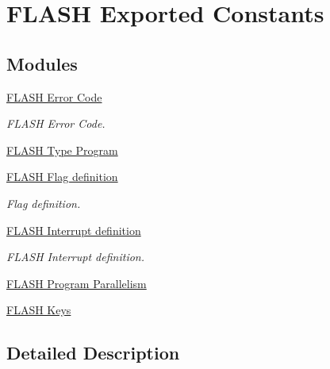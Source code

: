 \hypertarget{group___f_l_a_s_h___exported___constants}{}\section{F\+L\+A\+SH Exported Constants}
\label{group___f_l_a_s_h___exported___constants}
\subsection*{Modules}
\begin{DoxyCompactItemize}
\item 
\hyperlink{group___f_l_a_s_h___error___code}{F\+L\+A\+S\+H Error Code}
\begin{DoxyCompactList}\small\item\em F\+L\+A\+SH Error Code. \end{DoxyCompactList}\item 
\hyperlink{group___f_l_a_s_h___type___program}{F\+L\+A\+S\+H Type Program}
\item 
\hyperlink{group___f_l_a_s_h___flag__definition}{F\+L\+A\+S\+H Flag definition}
\begin{DoxyCompactList}\small\item\em Flag definition. \end{DoxyCompactList}\item 
\hyperlink{group___f_l_a_s_h___interrupt__definition}{F\+L\+A\+S\+H Interrupt definition}
\begin{DoxyCompactList}\small\item\em F\+L\+A\+SH Interrupt definition. \end{DoxyCompactList}\item 
\hyperlink{group___f_l_a_s_h___program___parallelism}{F\+L\+A\+S\+H Program Parallelism}
\item 
\hyperlink{group___f_l_a_s_h___keys}{F\+L\+A\+S\+H Keys}
\end{DoxyCompactItemize}


\subsection{Detailed Description}
